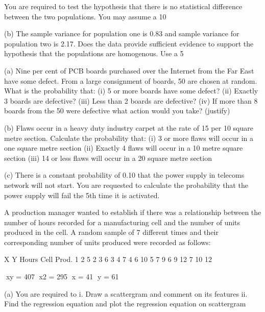 You are required to test the hypothesis that there is no statistical difference between the two populations.  You may assume a 10%

(b) 	The sample variance for population one is 0.83 and sample variance for population two is 2.17.  Does the data provide sufficient evidence to support the hypothesis that the populations are homogenous.  Use a 5%



(a)  	Nine per cent of PCB boards purchased over the Internet from the Far East have some defect.  From a large consignment of boards, 50 are chosen at random.  What is the probability that:
(i)	5 or more boards have some defect?
(ii)	Exactly 3 boards are defective?
(iii)	Less than 2 boards are defective?
(iv)	If more than 8 boards from the 50 were defective what action would you take? (justify)


(b) 	Flaws occur in a heavy duty industry carpet at the rate of 15 per 10 square metre section.  Calculate the probability that:
(i)	3 or more flaws will occur in a one square metre section
(ii)	Exactly 4 flaws will occur in a 10 metre square section
(iii)	14 or less flaws will occur in a 20 square metre section

(c)	There is a constant probability of 0.10 that the power supply in telecoms network will not start.  You are requested to calculate the probability that the power supply will fail the 5th time it is activated.


A production manager wanted to establish if there was a relationship between the number of hours recorded for a manufacturing cell and the number of units produced in the cell.  A random sample of 7 different times and their corresponding number of units produced were recorded as follows:


	X	Y
	Hours	Cell Prod.
1	2	5
2	3	6
3	4	7
4	6	10
5	7	9
6	9	12
7	10	12
	
	xy = 407		x2 = 295		x = 41		y = 61

(a) 	You are required to 
i.	Draw a scattergram and comment on its features
ii.	Find the regression equation and plot the regression equation on scattergram


